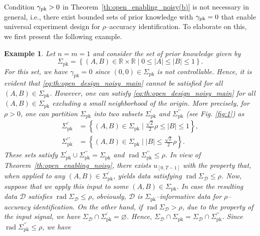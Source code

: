 \documentclass[journal,twoside,web]{ieeecolor}
\DeclareMathOperator{\rad}{rad}
\newcommand{\set}[2]{\left\{#1 \mid #2\right\}}
\newtheorem{example}[theorem]{Example}
\begin{document}
Condition $\gamma_\textup{pk}>0$ in Theorem~\ref{th:open_enabling_noisy(b)} is not necessary in general, i.e., there exist bounded sets of prior knowledge with $\gamma_\textup{pk}=0$ that enable universal experiment design for \mbox{$\rho$--accuracy} identification. To elaborate on this, we first present the following example.

\begin{example}
\label{ex:help0}
Let $n=m=1$ and consider the set of prior knowledge given by
\begin{equation}
\label{eq:pk_ex:help0}
\Sigma_\text{pk}=\set{(A,B)\in\mathbb{R}\times\mathbb{R}}{0\leq|A|\leq|B|\leq1}.
\end{equation}
For this set, we have $\gamma_\text{pk}=0$ since $(0,0)\in\Sigma_\text{pk}$ is not controllable. Hence, it is evident that \eqref{eq:th:open_design_noisy_main} cannot be satisfied for all $(A,B)\in\Sigma_\text{pk}$. However, one can satisfy \eqref{eq:th:open_design_noisy_main} for all $(A,B)\in\Sigma_\text{pk}$ excluding a small neighborhood of the origin. More precisely, for $\rho>0$, one can partition $\Sigma_\text{pk}$ into two subsets $\Sigma^\prime_\text{pk}$ and $\Sigma_\text{pk}^{\prime\prime}$ (see Fig. \ref{fig:1}) as
\begin{subequations}
\label{eq:pk_ex:help0_partition}
\begin{align}
\label{eq:pk_ex:help0_partition(a)}
\Sigma^\prime_\text{pk}&=\set{(A,B)\in\Sigma_\text{pk}}{\tfrac{\sqrt{2}}{2}\rho\leq|B|\leq1},\\ \label{eq:pk_ex:help0_partition(b)}
\Sigma_\text{pk}^{\prime\prime}&=\set{(A,B)\in\Sigma_\text{pk}}{|B|\leq\tfrac{\sqrt{2}}{2}\rho}.
\end{align}
\end{subequations}
These sets satisfy \mbox{$\Sigma_\text{pk}^\prime\cup\Sigma_\text{pk}^{\prime\prime}=\Sigma_\text{pk}$} and $\rad\Sigma_\text{pk}^{\prime\prime}\leq \rho$. In view of Theorem~\ref{th:open_enabling_noisy}, there exists $u_{[0,T-1]}$ with the property that, when applied to any $(A,B)\in\Sigma^\prime_\text{pk}$, yields data satisfying \mbox{$\rad\Sigma_\mathcal{D}\leq\rho$}. Now, suppose that we apply this input to some $(A,B)\in\Sigma_\text{pk}$. In case the resulting data $\mathcal{D}$ satisfies \mbox{$\rad\Sigma_\mathcal{D}\leq\rho$}, obviously, $\mathcal{D}$ is $\Sigma_\text{pk}$--informative data for \mbox{$\rho$--accuracy} identification. On the other hand, if $\rad\Sigma_\mathcal{D}>\rho$, due to the property of the input signal, we have \mbox{$\Sigma_\mathcal{D}\cap\Sigma^\prime_\text{pk}=\varnothing$}. Hence, $\Sigma_\mathcal{D}\cap\Sigma_\text{pk}=\Sigma_\mathcal{D}\cap\Sigma_\text{pk}^{\prime\prime}$. Since $\rad\Sigma_\text{pk}^{\prime\prime}\leq \rho$, we have

\end{example}
\end{document}

